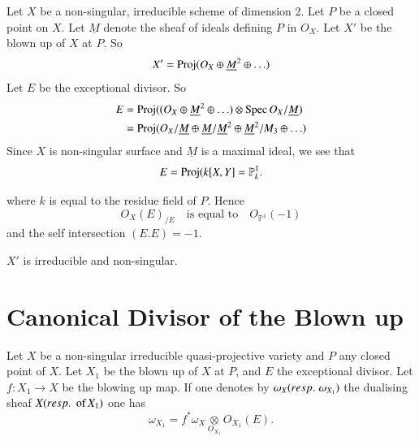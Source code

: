 Let $X$ be a non-singular, irreducible scheme of dimension 2. Let $P$
be a closed point on $X$. Let $\underline{M}$ denote the sheaf of
ideals defining $P$ in $O_X$. Let $X'$ be the blown up of $X$ at
$P$. So
$$
X'=\operatorname{Proj}(O_X\oplus\underline{M}^2\oplus\ldots)
$$
Let $E$ be the exceptional divisor. So 
\begin{align*}
E &= \operatorname{Proj}((O_X\oplus\underline{M}^2\oplus\ldots)\otimes\operatorname{Spec} O_X/
\underline{M})\\ 
&= \operatorname{Proj} (O_X/\underline{M}\oplus\underline{M}/\underline{M}^2 \oplus
\underline{M}^2/M_3\oplus\ldots)
\end{align*}
Since $X$ is non-singular surface and $\underline{M}$ is a maximal
ideal, we see that 
$$
E=\operatorname{Proj}(k[X,Y]=\mathbb{P}_k^1.
$$\pageoriginale

where $k$ is equal to the residue field of $P$. Hence
$$
O_X(E)_{/E}\quad\text{is equal to}\quad O_{\mathbb{P}^1}(-1)
$$
and the self intersection $(E.E)=-1$. 
\begin{REM*}
$X'$ is irreducible and non-singular.
\end{REM*}

\section{Canonical Divisor of the Blown up}\label{chap2:sec3} 
\begin{Prop*}
Let $X$ be a non-singular irreducible quasi-projective variety and $P$
any closed point of $X$. Let $X_1$ be the blown up of $X$ at $P$, and
$E$ the exceptional divisor. Let $f:X_1\longrightarrow X$ be the
blowing up map. If one denotes by $\omega_X({resp.}\kern.3em\omega_{X_1})$ the
dualising sheaf $X({resp.}\kern.3em\,\text{of}\, X_1)$ one has 
$$
\omega_{X_1}=f^*\omega_X\underset{O_{X_1}}{\otimes}O_{X_1}(E).
$$
\end{Prop*}

